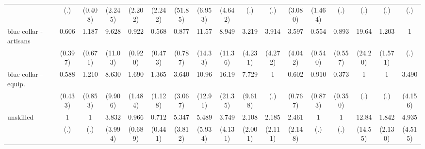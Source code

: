 {\begin{tabular}{l*{16}{c}}
                    &         (.)         &     (0.408)         &     (2.245)         &     (2.202)         &     (2.242)         &     (51.85)         &     (6.953)         &     (4.642)         &         (.)         &         (.)         &     (3.080)         &     (1.464)         &         (.)         &         (.)         &         (.)         &         (.)         \\
[1em]
blue collar - artisans&       0.606         &       1.187         &       9.628\sym{*}  &       0.922         &       0.568         &       0.877         &       11.57\sym{*}  &       8.949         &       3.219         &       3.914         &       3.597         &       0.554         &       0.893         &       19.64\sym{*}  &       1.203         &           1         \\
                    &     (0.397)         &     (0.671)         &     (11.03)         &     (0.920)         &     (0.473)         &     (0.787)         &     (14.33)         &     (11.36)         &     (4.231)         &     (4.272)         &     (4.042)         &     (0.540)         &     (0.557)         &     (24.20)         &     (1.571)         &         (.)         \\
[1em]
blue collar - equip.&       0.588         &       1.210         &       8.630         &       1.690         &       1.365         &       3.640         &       10.96\sym{*}  &       16.19\sym{*}  &       7.729         &           1         &       0.602         &       0.910         &       0.373         &           1         &           1         &       3.490         \\
                    &     (0.433)         &     (0.853)         &     (9.906)         &     (1.484)         &     (1.128)         &     (3.067)         &     (12.91)         &     (21.35)         &     (9.618)         &         (.)         &     (0.767)         &     (0.873)         &     (0.350)         &         (.)         &         (.)         &     (4.156)         \\
[1em]
unskilled           &           1         &           1         &       3.832         &       0.966         &       0.712         &       5.347\sym{*}  &       5.489         &       3.749         &       2.108         &       2.185         &       2.461         &           1         &           1         &       12.84\sym{*}  &       1.842         &       4.935         \\
                    &         (.)         &         (.)         &     (3.994)         &     (0.689)         &     (0.441)         &     (3.812)         &     (5.934)         &     (4.131)         &     (2.001)         &     (2.111)         &     (2.148)         &         (.)         &         (.)         &     (14.55)         &     (2.130)         &     (4.515)         \\

\end{tabular}}
